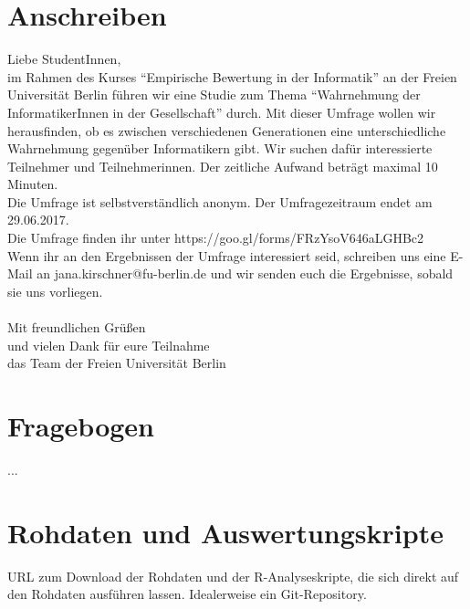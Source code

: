 \documentclass[de]{agse-empir-report}\usepackage[]{graphicx}\usepackage[]{color}
\begin{document}
\nocite{*}




\appendix

\section{Anschreiben}

Liebe StudentInnen,\\
im Rahmen des Kurses “Empirische Bewertung in der Informatik” an der Freien Universität Berlin führen wir eine Studie zum Thema “Wahrnehmung der InformatikerInnen in der Gesellschaft” durch. Mit dieser Umfrage wollen wir herausfinden, ob es zwischen verschiedenen Generationen eine unterschiedliche Wahrnehmung gegenüber Informatikern gibt. Wir suchen dafür interessierte Teilnehmer und Teilnehmerinnen. Der zeitliche Aufwand beträgt maximal 10 Minuten.\\
Die Umfrage ist selbstverständlich anonym. Der Umfragezeitraum endet am 29.06.2017.\\

Die Umfrage finden ihr  unter https://goo.gl/forms/FRzYsoV646aLGHBc2 \\

Wenn ihr an den Ergebnissen der Umfrage interessiert seid, schreiben uns eine E-Mail an jana.kirschner@fu-berlin.de und wir senden euch die Ergebnisse, sobald sie uns vorliegen.\\ \\

Mit freundlichen Grüßen\\
und vielen Dank für eure Teilnahme\\ 
das Team der Freien Universität Berlin\\



\section{Fragebogen}

...


\section{Rohdaten und Auswertungskripte}

URL zum Download der Rohdaten und der R-Analyseskripte, die sich direkt auf den
Rohdaten ausführen lassen.
Idealerweise ein Git-Repository.
\end{document}
